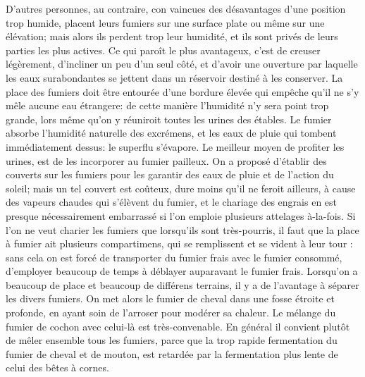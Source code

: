 D'autres personnes, au contraire, con\setcounter{page}{303} vaincues des désavantages d'une position trop humide, placent leurs fumiers sur une surface plate ou même sur une élévation; mais alors ils perdent trop leur humidité, et ils sont privés de leurs parties les plus actives. Ce qui paroît le plus avantageux, c'est de creuser légèrement, d'incliner un peu d'un seul côté, et d'avoir une ouverture par laquelle les eaux surabondantes se jettent dans un réservoir destiné à les conserver. La place des fumiers doit être entourée d'une bordure élevée qui empêche qu'il ne s'y mêle aucune eau étrangere: de cette manière l'humidité n'y sera point trop grande, lors même qu'on y réuniroit toutes les urines des étables. Le fumier absorbe l'humidité naturelle des excrémens, et les eaux de pluie qui tombent immédiatement dessus: le superflu s'évapore. Le meilleur moyen de profiter les urines, est de les incorporer au fumier pailleux. On a proposé d'établir des couverts sur les fumiers pour les garantir des eaux de pluie et de l'action du soleil; mais un tel couvert est coûteux, dure moins qu'il ne feroit ailleurs, à cause des vapeurs chaudes qui s'élèvent du fumier, et le chariage des engrais en est presque nécessairement embarrassé si l'on emploie plusieurs attelages à-la-fois.\setcounter{page}{304} Si l'on ne veut charier les fumiers que lorsqu'ils sont très-pourris, il faut que la place à fumier ait plusieurs compartimens, qui se remplissent et se vident à leur tour : sans cela on est forcé de transporter du fumier frais avec le fumier consommé, d'employer beaucoup de temps à déblayer auparavant le fumier frais.
Lorsqu'on a beaucoup de place et beaucoup de différens terrains, il y a de l'avantage à séparer les divers fumiers. On met alors le fumier de cheval dans une fosse étroite et profonde, en ayant soin de l'arroser pour modérer sa chaleur. Le mélange du fumier de cochon avec celui-là est très-convenable. En général il convient plutôt de mêler ensemble tous les fumiers, parce que la trop rapide fermentation du fumier de cheval et de mouton, est retardée par la fermentation plus lente de celui des bêtes à cornes.
